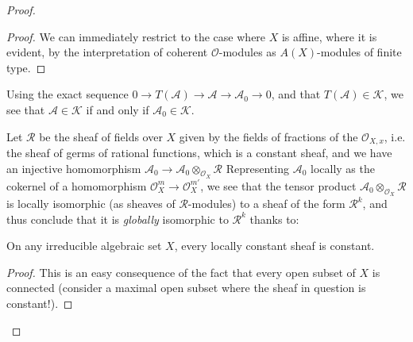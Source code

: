 \documentclass{article}
\theoremstyle{plain}
\newenvironment{lemma}[1]
    {\renewcommand\theinnercustomlemma{#1}\innercustomlemma}
    {\endinnercustomlemma}
\theoremstyle{definition}
\newcommand{\sh}[1]{{\mathscr{#1}}}
\newcommand{\cat}[1]{{\mathcal{#1}}}
\begin{document}
\begin{proof}
  \begin{proof}
    We can immediately restrict to the case where $X$ is affine, where it is evident, by the interpretation of coherent $\sh{O}$-modules as $A(X)$-modules of finite type.
  \end{proof}

  Using the exact sequence $0\to T(\sh{A})\to \sh{A}\to \sh{A}_0\to 0$, and that $T(\sh{A})\in\cat{K}$, we see that $\sh{A}\in\cat{K}$ if and only if $\sh{A}_0\in\cat{K}$.

  Let $\sh{R}$ be the sheaf of fields over $X$ given by the fields of fractions of the $\sh{O}_{X,x}$, i.e. the sheaf of germs of rational functions, which is a constant sheaf, and we have an injective homomorphism $\sh{A}_0\to\sh{A}_0\otimes_{\sh{O}_X}\sh{R}$
  Representing $\sh{A}_0$ locally as the cokernel of a homomorphism $\sh{O}_X^m\to\sh{O}_X^{m'}$, we see that the tensor product $\sh{A}_0\otimes_{\sh{O}_X}\sh{R}$ is locally isomorphic (as sheaves of $\sh{R}$-modules) to a sheaf of the form $\sh{R}^k$, and thus conclude that it is \emph{globally} isomorphic to $\sh{R}^k$ thanks to:

  \begin{lemma}{3}
  \label{lemma3}
    On any irreducible algebraic set $X$, every locally constant sheaf is constant.
  \end{lemma}

  \begin{proof}
    This is an easy consequence of the fact that every open subset of $X$ is connected (consider a maximal open subset where the sheaf in question is constant!).
  \end{proof}


\end{proof}
\end{document}
